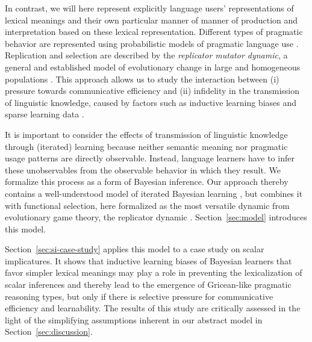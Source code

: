 \documentclass[a4paper, 11pt]{article}
\theoremstyle{Satz}
\begin{document}
In contrast, we will here represent explicitly language users' representations of lexical
meanings and their own particular manner of manner of production and interpretation based on
these lexical representation. Different types of pragmatic behavior are represented using
probabilistic models of pragmatic language use
\citep{frank+goodman:2012,FrankeJager2015:Probabilistic-p,GoodmanFrank2016:Pragmatic-Langu}. Replication
and selection are described by the \emph{replicator mutator dynamic}, a general and established
model of evolutionary change in large and homogeneous populations
\citep{Hofbauer1985:The-Selection-M,nowak+etal:2000,NowakKomarova2001:Evolution-of-Un,hofbauer+sigmund:2003,nowak:2006}. This
approach allows us to study the interaction between (i) pressure towards communicative
efficiency and (ii) infidelity in the transmission of linguistic knowledge, caused by factors
such as inductive learning biases and sparse learning data
\citep{KirbyHurford2002:The-Emergence-o,SmithKirby2003:Iterated-Learni,KirbyGriffith2014:Iterated-Learni}. 

It is important to consider the effects of transmission of linguistic knowledge through
(iterated) learning because neither semantic meaning nor pragmatic usage patterns are directly
observable. Instead, language learners have to infer these unobservables from the observable
behavior in which they result. We formalize this process as a form of Bayesian inference. Our
approach thereby contains a well-understood model of iterated Bayesian learning
\citep{griffiths+kalish:2005,griffiths+kalish:2007}, but combines it with functional selection,
here formalized as the most versatile dynamic from evolutionary game theory, the replicator
dynamic \citep{TaylorJonker1978:Evolutionary-St}. Section~\ref{sec:model} introduces this
model.

Section~\ref{sec:si-case-study} applies this model to a case study on scalar implicatures. It
shows that inductive learning biases of Bayesian learners that favor simpler lexical meanings
may play a role in preventing the lexicalization of scalar inferences and thereby lead to the
emergence of Gricean-like pragmatic reasoning types, but only if there is selective pressure
for communicative efficiency and learnability. The results of this study are critically
assessed in the light of the simplifying assumptions inherent in our abstract model in Section~\ref{sec:discussion}.

\end{document}
